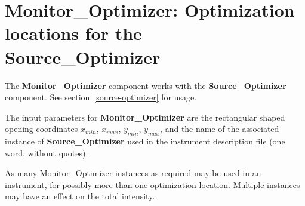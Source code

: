 
\section{Monitor\_Optimizer: Optimization locations for the\\
  Source\_Optimizer}
\label{monitor-optimizer}

The {\bf Monitor\_Optimizer} component works with the {\bf
  Source\_Optimizer} component. See section~\ref{source-optimizer}
for usage.

The input parameters for {\bf Monitor\_Optimizer} are the rectangular
shaped opening coordinates $x_{min}$, $x_{max}$, $y_{min}$,
$y_{max}$, and the name of the associated instance of
{\bf Source\_Optimizer} used in the instrument description file (one word,
without quotes).

As many Monitor\_Optimizer instances as required may be used in an instrument, for possibly more than one optimization location. Multiple instances may have an effect on the total intensity.
